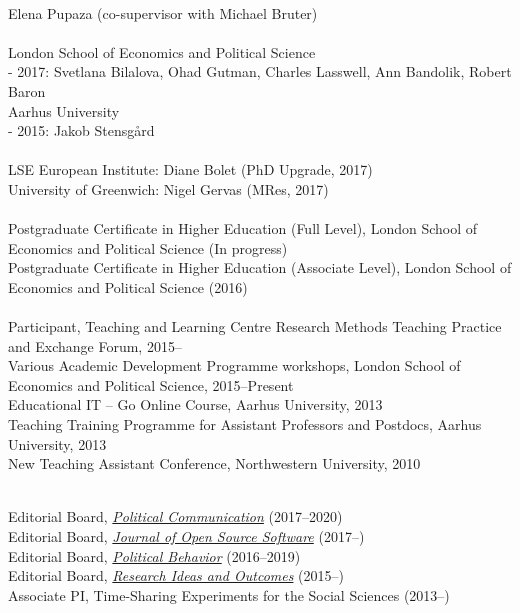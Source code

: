 \documentclass[12pt]{article}
\renewcommand{\section}[1]{\pagebreak[3]%
    \llap{\scshape\smash{\parbox[t]{\marginparwidth}{\raggedright {\color{lg}#1}}}}%
    \vspace{-\baselineskip}\par}
\newcommand{\topic}[1]{\pagebreak[3]\indent {\color{lg}{\footnotesize #1 }}\\}
\newcommand{\entry}[1]{\indent {\color{lg}\guillemotright}\hspace{2pt}#1\vspace{.25em}\\}
\newcommand{\subentry}[1]{{\color{lg}-} #1\vspace{.25em}\\}
\begin{document}
\topic{PhD Supervision}
    \entry{Elena Pupaza (co-supervisor with Michael Bruter)}

\topic{Master Thesis Supervision}
	\entry{London School of Economics and Political Science}
        \subentry{2017: Svetlana Bilalova, Ohad Gutman, Charles Lasswell, Ann Bandolik, Robert Baron}
	\entry{Aarhus University}
		\subentry{2015: Jakob Stensg{\aa}rd}

\topic{External Examining}
    \entry{LSE European Institute: Diane Bolet (PhD Upgrade, 2017)}
    \entry{University of Greenwich: Nigel Gervas (MRes, 2017)}

\topic{Pedagogical Qualifications}
    \entry{Postgraduate Certificate in Higher Education (Full Level), London School of Economics and Political Science (In progress)}
    \entry{Postgraduate Certificate in Higher Education (Associate Level), London School of Economics and Political Science (2016)}
	
\topic{Pedagogical Training}
	\entry{Participant, Teaching and Learning Centre Research Methods Teaching Practice and Exchange Forum, 2015--}
	\entry{Various Academic Development Programme workshops, London School of Economics and Political Science, 2015--Present}
	\entry{Educational IT -- Go Online Course, Aarhus University, 2013}
	\entry{Teaching Training Programme for Assistant Professors and Postdocs, Aarhus University, 2013}
	\entry{New Teaching Assistant Conference, Northwestern University, 2010}

\section{Editing \&\\ Reviewing}
\topic{Editing}
	\entry{Editorial Board, \href{http://www.tandfonline.com/toc/upcp20/current}{\textit{Political Communication}} (2017--2020)}
    \entry{Editorial Board, \href{http://joss.theoj.org/}{\textit{Journal of Open Source Software}} (2017--)}
    \entry{Editorial Board, \href{http://link.springer.com/journal/11109}{\textit{Political Behavior}} (2016--2019)}
	\entry{Editorial Board, \href{http://riojournal.com/}{\textit{Research Ideas and Outcomes}} (2015--)}
	\entry{Associate PI, Time-Sharing Experiments for the Social Sciences (2013--)}
\end{document}

